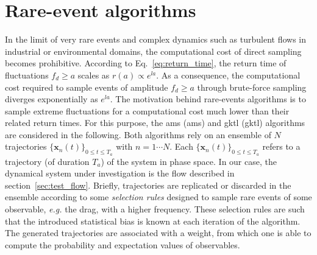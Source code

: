 \documentclass[pre,aps,floatfix,10pt,superscriptaddress, notitlepage,preprint]{revtex4-1}
\begin{document}
\section{Rare-event algorithms}
\label{sec:rare_events_algorithms}
%
In the limit of very rare events and complex dynamics such as turbulent flows in industrial or environmental domains, the computational cost of  direct sampling becomes prohibitive. According to Eq.~\eqref{eq:return_time}, the return time of fluctuations $f_d \geq a$ scales as $r(a) \propto e^{l a}$.
As a consequence, the computational cost required to sample events of amplitude $f_d \geq a$ through brute-force sampling diverges exponentially as $e^{l a}$.
The motivation behind rare-events algorithms is to sample extreme fluctuations for a computational cost much lower than their related return times.
%
For this purpose, the \acl{ams} (\ac{ams}) and \acl{gktl} (\ac{gktl}) algorithms are considered in the following.
%
%
Both algorithms rely on an ensemble of $N$ trajectories $\{\mathbf{x}_n(t)\}_{0\leq t \leq T_a}$ with $n=1 \cdots N$.
Each $\{\mathbf{x}_n(t)\}_{0\leq t \leq T_a}$ refers to a trajectory (of duration $T_a$) of the system in phase space. In our case, the dynamical system under investigation is the flow described in section~\ref{sec:test_flow}.
Briefly, trajectories are replicated or discarded in the ensemble according to some \emph{selection rules} designed to sample rare events of some observable, \textit{e.g.} the drag, with a higher frequency.
These selection rules are such that the introduced statistical bias is known at each iteration of the algorithm.
The generated trajectories are associated with a weight, from which one is able to compute the probability and expectation values of observables. 
\end{document}
